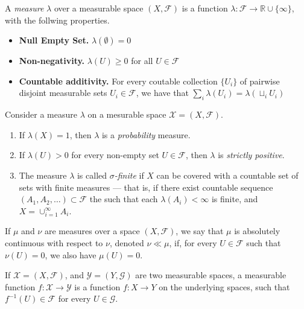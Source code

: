 \documentclass[twoside]{article} %
\theoremstyle{plain}
\theoremstyle{definition}
\begin{document}
    \begin{defn}[Measure]
        A \emph{measure} $\lambda$ over a measurable space $(X, \mathcal F)$ is a function $\lambda : \mathcal F \to \mathbb R \cup \{\infty\}$, with the follwing properties.
        \begin{itemize}[itemsep=0pt]
            \item \textbf{Null Empty Set.} $\lambda(\emptyset) = 0$
            \item \textbf{Non-negativity.} $\lambda(U) \ge 0$ for all $U \in \mathcal F$
            \item \textbf{Countable additivity.} For every coutable collection $\{U_i\}$ of pairwise disjoint measurable sets $U_i \in \mathcal F$, we have that
             $\sum_{i} \lambda(U_i) = \lambda(\sqcup_i U_i)$
        \end{itemize}
    \end{defn}
    
    \begin{defn}
        Consider a measure $\lambda$ on a mesurable space $\mathcal X = (X, \mathcal F)$.
        \begin{enumerate}
            \item If $\lambda(X) = 1$, then $\lambda$ is a \emph{probability} measure. \\
            \item If $\lambda(U) > 0$ for every non-empty set $U \in \mathcal F$, then $\lambda$ is \emph{strictly positive}.
            \item The measure $\lambda$ is called \emph{$\sigma$-finite} if $X$ can be
            covered with a countable set of sets with finite measures --- that is, if
            there exist countable sequence $(A_1, A_2, \ldots ) \subset \mathcal F$ the
            such that each $\lambda(A_i) < \infty$ is finite, and $X = \cup_{i=1}^{\infty}
            A_i$.
        \end{enumerate}
    \end{defn}
    
    \begin{defn}
        If $\mu$ and $\nu$ are measures over a space $(X, \mathcal F)$, 
        we say that $\mu$ is absolutely continuous with respect to $\nu$, denoted $\nu \ll \mu$, if, for every $U \in \mathcal F$ such that $\nu(U) = 0$, we also have $\mu(U) = 0$. 
    \end{defn}
    
    \begin{defn}
        If $\mathcal X  = (X, \mathcal F)$, and $\mathcal Y = (Y, \mathcal G)$ are two measurable spaces, a measurable function $f : \mathcal X \to \mathcal Y$ is a function $f: X \to Y$ on the underlying spaces, such that 
        $f^{-1}(U) \in \mathcal F$ for every $U \in \mathcal G$.
    \end{defn}
    
\end{document}
